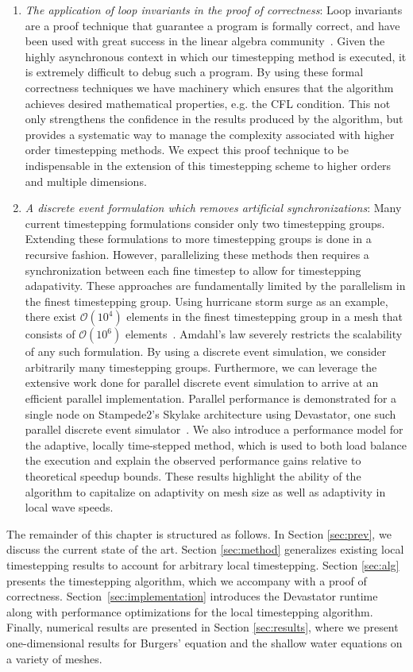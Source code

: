 \begin{enumerate}
    \item {\em The application of loop invariants in the proof of correctness}: Loop invariants are a proof technique that guarantee a program is formally correct, and have been used with great success in the linear algebra community~\cite{Bientinesi2011}. Given the highly asynchronous context in which our timestepping method is executed, it is extremely difficult to debug such a program. By using these formal correctness techniques we have machinery which ensures that the algorithm achieves desired mathematical properties, e.g. the CFL condition. This not only strengthens the confidence in the results produced by the algorithm, but provides a systematic way to manage the complexity associated with higher order timestepping methods. We expect this proof technique to be indispensable in the extension of this timestepping scheme to higher orders and multiple dimensions.
    \item {\em A discrete event formulation which removes artificial synchronizations}: Many current timestepping formulations consider only two timestepping groups. Extending these formulations to more timestepping groups is done in a recursive fashion. However, parallelizing these methods then requires a synchronization between each fine timestep to allow for timestepping adapativity. These approaches are fundamentally limited by the parallelism in the finest timestepping group. Using hurricane storm surge as an example, there exist $\mathcal{O}(10^4)$ elements in the finest timestepping group in a mesh that consists of $\mathcal{O}(10^6)$ elements~\cite{Dawson2013}. Amdahl's law severely restricts the scalability of any such formulation. By using a discrete event simulation, we consider arbitrarily many timestepping groups. Furthermore, we can leverage the extensive work done for parallel discrete event simulation to arrive at an efficient parallel implementation. Parallel performance is demonstrated for a single node on Stampede2's Skylake architecture using Devastator, one such parallel discrete event simulator~\cite{Chan2018}. We also introduce a performance model for the adaptive, locally time-stepped method, which is used to both load balance the execution and explain the observed performance gains relative to theoretical speedup bounds.  These results highlight the ability of the algorithm to capitalize on adaptivity on mesh size as well as adaptivity in local wave speeds.
\end{enumerate}

The remainder of this chapter is structured as follows. In Section \ref{sec:prev}, we discuss the current state of the art. Section \ref{sec:method} generalizes existing local timestepping results to account for arbitrary local timestepping. Section \ref{sec:alg} presents the timestepping algorithm, which we accompany with a proof of correctness. Section~\ref{sec:implementation} introduces the Devastator runtime along with performance optimizations for the local timestepping algorithm. Finally, numerical results are presented in Section \ref{sec:results}, where we present one-dimensional results for Burgers' equation and the shallow water equations on a variety of meshes.
